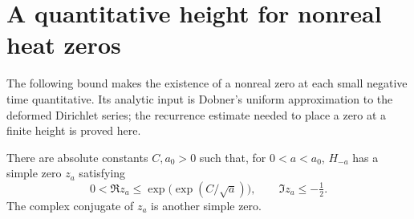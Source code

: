 \section{A quantitative height for nonreal heat zeros}
\label{sec:height}
The following bound makes the existence of a nonreal zero at each small
negative time quantitative. Its analytic input is Dobner's uniform
approximation to the deformed Dirichlet series; the recurrence estimate
needed to place a zero at a finite height is proved here.

\begin{theorem}\label{thm:nonreal-height}
There are absolute constants $C,a_0>0$ such that, for $0<a<a_0$,
$H_{-a}$ has a simple zero $z_a$ satisfying
\[
 0<\Re z_a\le \exp\!\bigl(\exp(C/\sqrt a)\bigr),
 \qquad \Im z_a\le-\tfrac12.
\]
The complex conjugate of $z_a$ is another simple zero.
\end{theorem}

